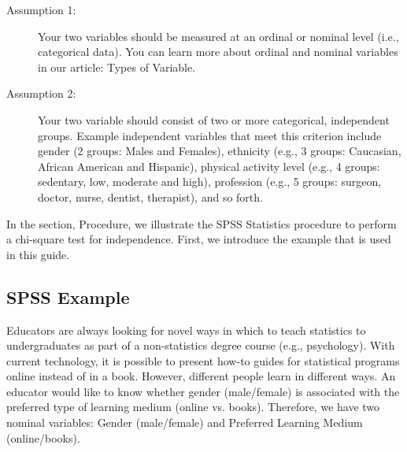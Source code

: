 \documentclass[]{report}
\begin{document}
\begin{description}
	\item[Assumption 1:] Your two variables should be measured at an ordinal or nominal level (i.e., categorical data). You can learn more about ordinal and nominal variables in our article: Types of Variable.
	\item[Assumption 2:] Your two variable should consist of two or more categorical, independent groups. Example independent variables that meet this criterion include gender (2 groups: Males and Females), ethnicity (e.g., 3 groups: Caucasian, African American and Hispanic), physical activity level (e.g., 4 groups: sedentary, low, moderate and high), profession (e.g., 5 groups: surgeon, doctor, nurse, dentist, therapist), and so forth.
\end{description}
In the section, Procedure, we illustrate the SPSS Statistics procedure to perform a chi-square test for independence. First, we introduce the example that is used in this guide.


\subsection{SPSS Example}
Educators are always looking for novel ways in which to teach statistics to undergraduates as part of a non-statistics degree course (e.g., psychology). With current technology, it is possible to present how-to guides for statistical programs online instead of in a book. However, different people learn in different ways. An educator would like to know whether gender (male/female) is associated with the preferred type of learning medium (online vs. books). Therefore, we have two nominal variables: Gender (male/female) and Preferred Learning Medium (online/books).
\end{document}
